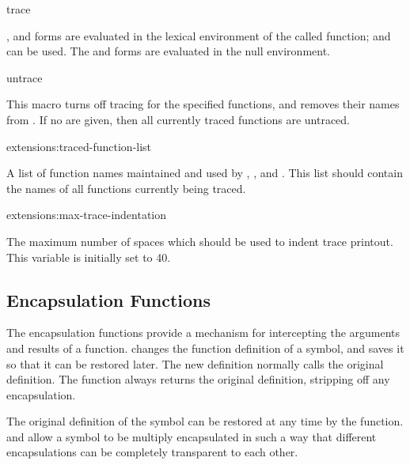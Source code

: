 \begin{defmac}{}{trace}{%
    }
    

  
  ,  and  forms are evaluated in
  the lexical environment of the called function;  and
   can be used.  The  and 
  forms are evaluated in the null environment.
\end{defmac}

\begin{defmac}{}{untrace}{ }
  
  This macro turns off tracing for the specified functions, and
  removes their names from .  If no
   are given, then all currently traced functions
  are untraced.
\end{defmac}

\begin{defvar}{extensions:}{traced-function-list}
  
  A list of function names maintained and used by ,
  , and .  This list should contain
  the names of all functions currently being traced.
\end{defvar}

\begin{defvar}{extensions:}{max-trace-indentation}
  
  The maximum number of spaces which should be used to indent trace
  printout.  This variable is initially set to 40.
\end{defvar}


\subsection{Encapsulation Functions}

The encapsulation functions provide a mechanism for intercepting the
arguments and results of a function.   changes the
function definition of a symbol, and saves it so that it can be
restored later.  The new definition normally calls the original
definition.  The \clisp{}  function always returns
the original definition, stripping off any encapsulation.

The original definition of the symbol can be restored at any time by
the  function.   and 
allow a symbol to be multiply encapsulated in such a way that different
encapsulations can be completely transparent to each other.

